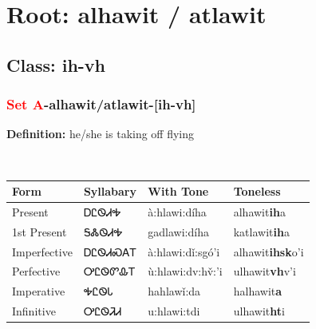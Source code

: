 \needspace{4in}
\section*{Root: alhawit / atlawit}
\nopagebreak
{}
\needspace{3in}
\subsection*{Class: ih-vh}
\nopagebreak
\needspace{2in}
\subsubsection*{\textcolor{Red}{Set A}{-}\textbf{alhawit/atlawit}{-}[ih-vh]}
\nopagebreak
\textbf{Definition: } he/she is taking off flying
\\[0.5em]
\begin{tabularx}{\textwidth}{l X X X}%
\toprule%
\textbf{Form}&\textbf{Syllabary}&\textbf{With Tone}&\textbf{Toneless}\\%
\midrule%
Present&ᎠᏝᏫᏗᎭ&à:hlawi:díha&alhawit\textbf{ih}a\\%
1st Present&ᎦᏜᏫᏗᎭ&gadlawi:díha&katlawit\textbf{ih}a\\%
Imperfective&ᎠᏝᏫᏗᏍᎪᎢ&à:hlawi:dǐ:sgó’i&alhawit\textbf{ihsk}o'i\\%
Perfective&ᎤᏝᏫᏛᎲᎢ&ù:hlawi:dv:hv̌:’i&ulhawit\textbf{vh}v'i\\%
Imperative&ᎭᏝᏫᏓ&hahlawǐ:da&halhawit\textbf{a}\\%
Infinitive&ᎤᏝᏫᏘᏗ&u:hlawi:tdi&ulhawit\textbf{ht}i\\%
\bottomrule%
\end{tabularx}
\\[1em]